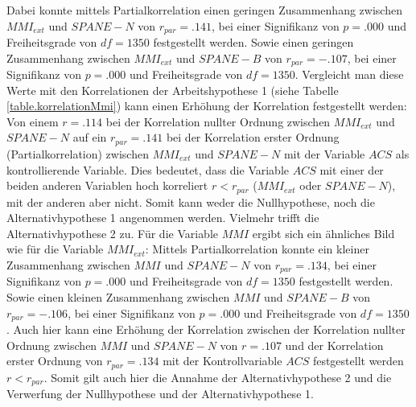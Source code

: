 Dabei konnte mittels Partialkorrelation einen geringen Zusammenhang zwischen $MMI_{ext}$ und $SPANE-N$ von $r_{par}=.141$, bei einer Signifikanz von $p=.000$ und Freiheitsgrade von $df=1350$ festgestellt werden. Sowie einen geringen Zusammenhang zwischen $MMI_{ext}$ und $SPANE-B$ von $r_{par}=-.107$, bei einer Signifikanz von $p=.000$ und Freiheitsgrade von $df=1350$. Vergleicht man diese Werte mit den Korrelationen der Arbeitshypothese 1 (siehe Tabelle \ref{table.korrelationMmi}) kann einen Erhöhung der Korrelation festgestellt werden: Von einem $r=.114$ bei der Korrelation nullter Ordnung zwischen $MMI_{ext}$ und $SPANE-N$ auf ein $r_{par}=.141$ bei der Korrelation erster Ordnung (Partialkorrelation) zwischen  $MMI_{ext}$ und $SPANE-N$ mit der Variable $ACS$ als kontrollierende Variable. Dies bedeutet, dass die Variable $ACS$ mit einer der beiden anderen Variablen hoch korreliert $r < r_{par}$ ($MMI_{ext}$ oder $SPANE-N$), mit der anderen aber nicht. Somit kann weder die Nullhypothese, noch die Alternativhypothese 1 angenommen werden. Vielmehr trifft die Alternativhypothese 2 zu. Für die Variable $MMI$ ergibt sich ein ähnliches Bild wie für die Variable $MMI_{ext}$: Mittels Partialkorrelation konnte ein kleiner Zusammenhang zwischen $MMI$ und $SPANE-N$ von $r_{par}=.134$, bei einer Signifikanz von $p=.000$ und Freiheitsgrade von $df=1350$ festgestellt werden. Sowie einen kleinen Zusammenhang zwischen $MMI$ und $SPANE-B$ von $r_{par}=-.106$, bei einer Signifikanz von $p=.000$ und Freiheitsgrade von $df=1350$. Auch hier kann eine Erhöhung der Korrelation zwischen der Korrelation nullter Ordnung zwischen $MMI$ und $SPANE-N$ von $r=.107$ und der Korrelation erster Ordnung von $r_{par}=.134$ mit der Kontrollvariable $ACS$ festgestellt werden $r < r_{par}$. Somit gilt auch hier die Annahme der Alternativhypothese 2 und die Verwerfung der Nullhypothese und der Alternativhypothese 1. 

